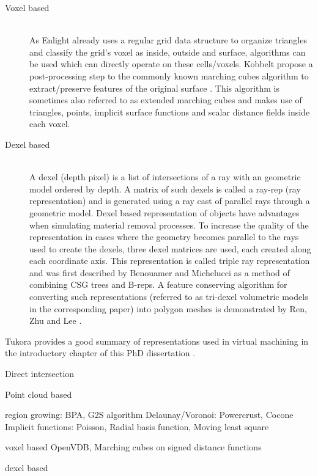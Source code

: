 \begin{description}
	
	\item[Voxel based] \hfill \\
	As Enlight already uses a regular grid data structure to organize triangles and classify the grid's voxel as inside, outside and surface, algorithms can be used which can directly operate on these cells/voxels.
	Kobbelt \etal propose a post-processing step to the commonly known marching cubes algorithm to extract/preserve features of the original surface \cite{extended_marching_cubes}. This algorithm is sometimes also referred to as extended marching cubes and makes use of triangles, points, implicit surface functions and scalar distance fields inside each voxel.
	
	
	\item[Dexel based] \hfill \\
	A dexel (depth pixel) is a list of intersections of a ray with an geometric model ordered by depth. A matrix of such dexels is called a ray-rep (ray representation) and is generated using a ray cast of parallel rays through a geometric model. Dexel based representation of objects have advantages when simulating material removal processes. To increase the quality of the representation in cases where the geometry becomes parallel to the rays used to create the dexels, three dexel matrices are used, each created along each coordinate axis. This representation is called triple ray representation and was first described by Benouamer and Michelucci \cite{tridexel_intersection} as a method of combining CSG trees and B-reps. A feature conserving algorithm for converting such representations (referred to as tri-dexel volumetric models in the corresponding paper) into polygon meshes is demonstrated by Ren, Zhu and Lee \cite{tridexel_reconstruction}.
	
\end{description}



Tukora provides a good summary of representations used in virtual machining in the introductory chapter of this PhD dissertation \cite{virtual_machining_review}.

Direct intersection

Point cloud based

region growing: BPA, G2S algorithm
Delaunay/Voronoi: Powercrust, Cocone
Implicit functions: Poisson, Radial basis function, Moving least square

voxel based
OpenVDB, Marching cubes on signed distance functions

dexel based
